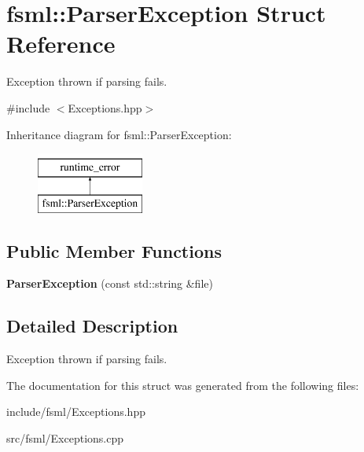 \hypertarget{structfsml_1_1ParserException}{\section{fsml\-:\-:Parser\-Exception Struct Reference}
\label{structfsml_1_1ParserException}
}


Exception thrown if parsing fails.  




{\ttfamily \#include $<$Exceptions.\-hpp$>$}

Inheritance diagram for fsml\-:\-:Parser\-Exception\-:\begin{figure}[H]
\begin{center}
\leavevmode
\includegraphics[height=2.000000cm]{structfsml_1_1ParserException}
\end{center}
\end{figure}
\subsection*{Public Member Functions}
\begin{DoxyCompactItemize}
\item 
\hypertarget{structfsml_1_1ParserException_a022b04432a881271696b5e9e7f9df5af}{{\bfseries Parser\-Exception} (const std\-::string \&file)}\label{structfsml_1_1ParserException_a022b04432a881271696b5e9e7f9df5af}

\end{DoxyCompactItemize}


\subsection{Detailed Description}
Exception thrown if parsing fails. 



The documentation for this struct was generated from the following files\-:\begin{DoxyCompactItemize}
\item 
include/fsml/Exceptions.\-hpp\item 
src/fsml/Exceptions.\-cpp\end{DoxyCompactItemize}
